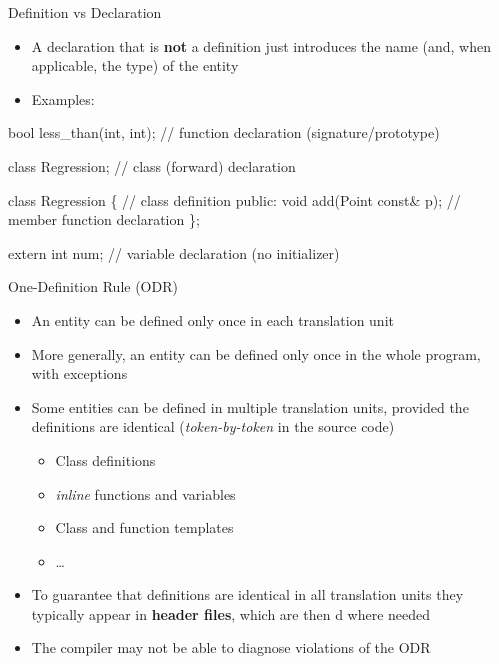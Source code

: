 \begin{frame}[fragile]{Definition vs Declaration \insertcontinuationtext}

  \begin{itemize}
  \item A \alert{declaration} that is \textbf{not} a definition just introduces
    the name (and, when applicable, the type) of the entity
  \item Examples:
  \end{itemize}

  \begin{codeblock}
bool less_than(int, int); // function declaration (signature/prototype)

class Regression; // class (forward) declaration

class Regression \{ // class definition
 public:
  void add(Point const& p); // member function declaration
  \ddd
\};

extern int num; // variable declaration (no initializer)\end{codeblock}

\end{frame}

\begin{frame}{One-Definition Rule (ODR)}
  \begin{itemize}[<+->]
  \item An entity can be defined only once in each translation unit
  \item More generally, an entity can be defined only once in the whole program,
    with exceptions
  \item Some entities can be defined in multiple translation units, provided the
    definitions are identical (\textit{token-by-token} in the source code)
    \begin{itemize}[<.->]
    \item Class definitions
    \item \textit{inline} functions and variables
    \item Class and function templates
    \item \ldots
    \end{itemize}
  \item To guarantee that definitions are identical in all translation units
    they typically appear in \textbf{header files}, which are then
    d where needed
  \item The compiler may not be able to diagnose violations of the ODR
  \end{itemize}
\end{frame}

